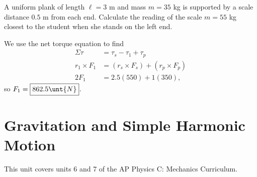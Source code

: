 \documentclass[11pt]{article}
\begin{document}
\begin{example}
	A uniform plank of length $\ell = 3$ m and mass $m = 35$ kg is supported by a scale distance $0.5$ m from each end. Calculate the reading of the scale $m = 55$ kg closest to the student when she stands on the left end.
\end{example}
\begin{solution}
	We use the net torque equation to find
	\begin{align*}
		\Sigma \tau &= \tau_s - \tau_1 + \tau_p \\
		r_1\times F_1 &= (r_s \times F_s) + (r_p \times F_p) \\
		2F_1 &= 2.5(550) + 1(350),
	\end{align*}
	so $F_1 = \boxed{862.5\unt{N}}$.
\end{solution}

\newpage

\part{Gravitation and Simple Harmonic Motion}
This unit covers units 6 and 7 of the AP Physics C: Mechanics Curriculum.
\end{document}
